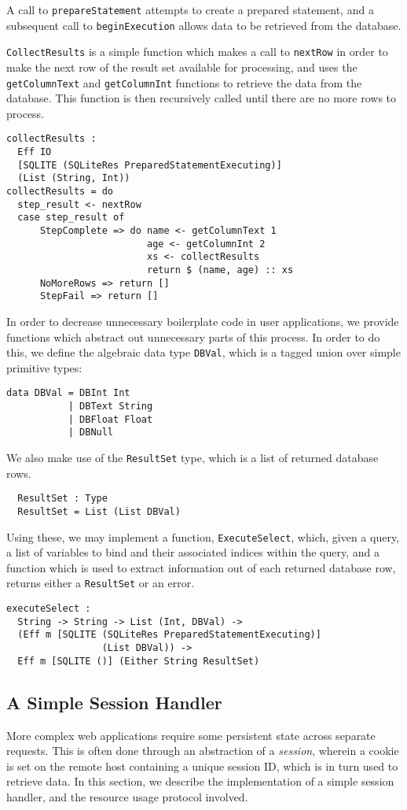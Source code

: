 \documentclass[preprint]{sigplanconf}
\begin{document}
A call to \texttt{prepareStatement} attempts to create a prepared statement, and a subsequent call to \texttt{beginExecution} allows data to be retrieved from the database.

\texttt{CollectResults} is a simple function which makes a call to \texttt{nextRow} in order to make the next row of the result set available for processing, and uses the \texttt{getColumnText} and \texttt{getColumnInt} functions to retrieve the data from the database. This function is then recursively called until there are no more rows to process.
\begin{Verbatim}
collectResults : 
  Eff IO 
  [SQLITE (SQLiteRes PreparedStatementExecuting)] 
  (List (String, Int))
collectResults = do
  step_result <- nextRow
  case step_result of
      StepComplete => do name <- getColumnText 1
                         age <- getColumnInt 2
                         xs <- collectResults
                         return $ (name, age) :: xs
      NoMoreRows => return []
      StepFail => return [] 
\end{Verbatim}
In order to decrease unnecessary boilerplate code in user applications, we provide functions which abstract out unnecessary parts of this process. In order to do this, we define the algebraic data type \texttt{DBVal}, which is a tagged union over simple primitive types:
\begin{Verbatim}
data DBVal = DBInt Int
           | DBText String
           | DBFloat Float
           | DBNull
\end{Verbatim}
We also make use of the \texttt{ResultSet} type, which is a list of returned database rows.
\begin{Verbatim}
  ResultSet : Type
  ResultSet = List (List DBVal)
\end{Verbatim}
Using these, we may implement a function, \texttt{ExecuteSelect}, which, given a query, a list of variables to bind and their associated indices within the query, and a function which is used to extract information out of each returned database row, returns either a \texttt{ResultSet} or an error.
\begin{Verbatim}
executeSelect : 
  String -> String -> List (Int, DBVal) -> 
  (Eff m [SQLITE (SQLiteRes PreparedStatementExecuting)] 
                 (List DBVal)) -> 
  Eff m [SQLITE ()] (Either String ResultSet)
\end{Verbatim}
\subsection{A Simple Session Handler}
More complex web applications require some persistent state across separate requests. This is often done through an abstraction of a \textit{session}, wherein a cookie is set on the remote host containing a unique session ID, which is in turn used to retrieve data. In this section, we describe the implementation of a simple session handler, and the resource usage protocol involved. 
\end{document}
